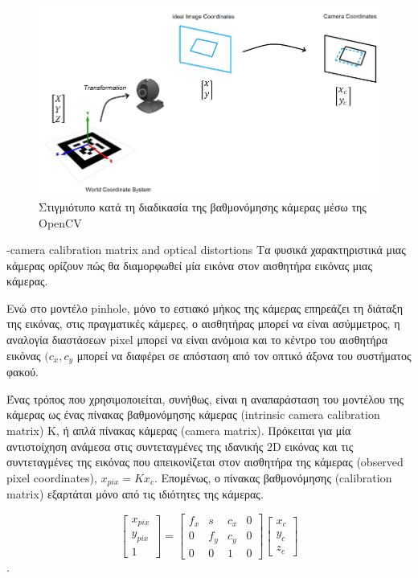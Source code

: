 \begin{figure}[H]
    \centering
    \includegraphics[scale=0.6, angle=0]{Files/Figures/transformation1.png}
    \caption[Στιγμιότυπο κατά τη διαδικασία της βαθμονόμησης κάμερας μέσω της OpenCV]{ Στιγμιότυπο κατά τη διαδικασία της βαθμονόμησης κάμερας μέσω της OpenCV}
    \label{fig:transformation1}
\end{figure}








-camera calibration matrix and optical distortions
Τα φυσικά χαρακτηριστικά μιας κάμερας ορίζουν πώς θα διαμορφωθεί μία εικόνα στον αισθητήρα εικόνας μιας κάμερας. 

Ενώ στο μοντέλο pinhole, μόνο το εστιακό μήκος της κάμερας επηρεάζει τη διάταξη της εικόνας, στις πραγματικές κάμερες, ο αισθητήρας μπορεί να είναι ασύμμετρος, η αναλογία διαστάσεων pixel μπορεί να είναι ανόμοια και το κέντρο του αισθητήρα εικόνας $(c_{x},c_{y}$ μπορεί να διαφέρει σε απόσταση από τον οπτικό άξονα του συστήματος φακού.

Ένας τρόπος που χρησιμοποιείται, συνήθως, είναι η αναπαράσταση του μοντέλου της κάμερας ως ένας πίνακας βαθμονόμησης κάμερας (intrinsic camera calibration matrix) K, ή απλά πίνακας κάμερας (camera matrix). Πρόκειται για μία αντιστοίχηση ανάμεσα στις συντεταγμένες της ιδανικής 2D εικόνας και τις συντεταγμένες της εικόνας που απεικονίζεται στον αισθητήρα της κάμερας (observed pixel coordinates), $x_{pix}=Κx_{c}$. Επομένως, ο πίνακας βαθμονόμησης (calibration matrix) εξαρτάται μόνο από τις ιδιότητες της κάμερας.


\begin{equation}
\begin{bmatrix}
x_{pix} \\ y_{pix} \\ 1
\end{bmatrix}
=
\begin{bmatrix}
f_{x} & s & c_{x} & 0\\
0 & f_{y} & c_{y} & 0\\
0 & 0 & 1 & 0
\end{bmatrix}
\begin{bmatrix}
x_{c}\\
y_{c}\\
z_{c}
\end{bmatrix}
\end{equation} .

